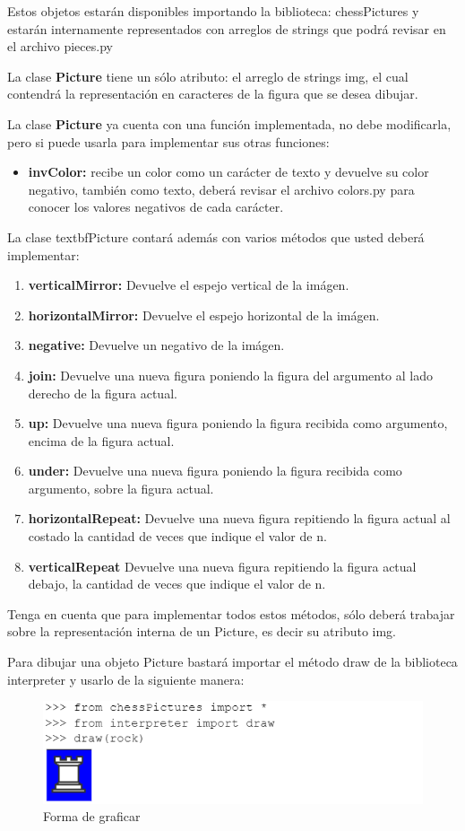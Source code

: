 \documentclass{article}
\begin{document}
  Estos objetos estarán disponibles importando la biblioteca: chessPictures y estarán internamente representados con arreglos de strings 
  que podrá revisar en el archivo pieces.py

  La clase \textbf{Picture} tiene un sólo atributo: el arreglo de strings img, el cual contendrá la representación en caracteres de la figura 
  que se desea dibujar. 
  
  La clase \textbf{Picture} ya cuenta con una función implementada, no debe modificarla, pero si puede usarla para implementar sus otras funciones:
  \begin{itemize}
    \item \textbf{invColor:} recibe un color como un carácter de texto y devuelve su color negativo, también como texto, deberá revisar el archivo colors.py 
    para conocer los valores negativos de cada carácter.
  \end{itemize}
  La clase textbf{Picture} contará además con varios métodos que usted deberá implementar:
  \begin{enumerate}
    \item \textbf{verticalMirror:} Devuelve el espejo vertical de la imágen.
    \item \textbf{horizontalMirror:} Devuelve el espejo horizontal de la imágen. 
    \item \textbf{negative:} Devuelve un negativo de la imágen.
    \item \textbf{join:} Devuelve una nueva figura poniendo la figura del argumento al lado derecho de la figura actual.
    \item \textbf{up:} Devuelve una nueva figura poniendo la figura recibida como argumento, encima de la figura actual.
    \item \textbf{under:} Devuelve una nueva figura poniendo la figura recibida como argumento, sobre la figura actual.
    \item \textbf{horizontalRepeat:} Devuelve una nueva figura repitiendo la figura actual al costado la cantidad de veces que indique el valor de n.
    \item \textbf{verticalRepeat} Devuelve una nueva figura repitiendo la figura actual debajo, la cantidad de veces que indique el valor de n.
  \end{enumerate}
  Tenga en cuenta que para implementar todos estos métodos, sólo deberá trabajar sobre la representación interna de un Picture, es decir 
  su atributo img.

  Para dibujar una objeto Picture bastará importar el método draw de la biblioteca interpreter y usarlo de la siguiente manera:
  \begin{figure}[H]
    \centering
    \includegraphics[width=1\textwidth, keepaspectratio]{img/considerar.png}
    \caption{Forma de graficar}
  \end{figure}
  \newpage
  
\end{document}
